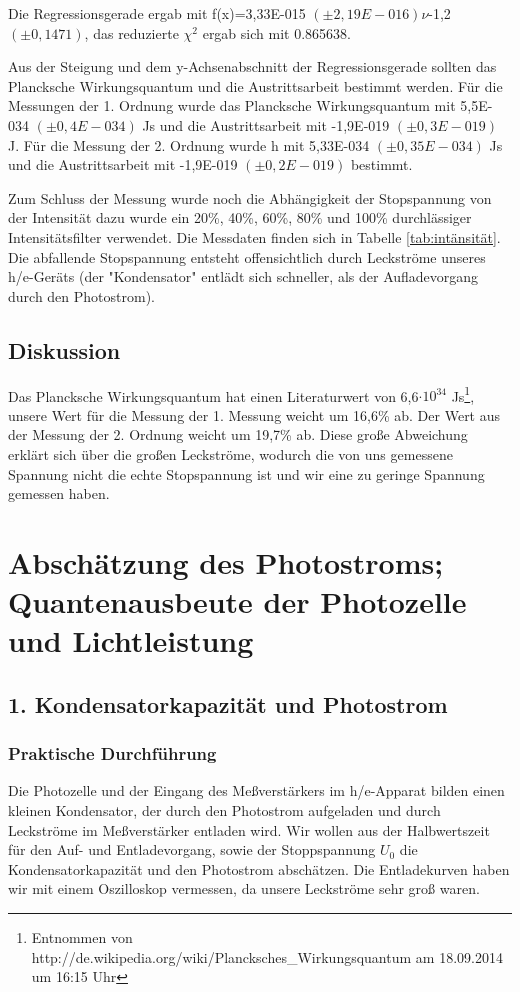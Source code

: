 \documentclass[12px]{scrartcl}
\begin{document}
Die Regressionsgerade ergab mit f(x)=3,33E-015 $(\pm 2,19E-016) \nu$-1,2 $(\pm 0,1471)$, das reduzierte $\chi^2$ ergab sich mit 0.865638.

Aus der Steigung und dem y-Achsenabschnitt der Regressionsgerade sollten das Plancksche Wirkungsquantum und die Austrittsarbeit bestimmt werden. Für die Messungen der 1. Ordnung wurde das Plancksche Wirkungsquantum mit 5,5E-034 $(\pm 0,4E-034)$ Js und die Austrittsarbeit mit -1,9E-019 $(\pm 0,3E-019)$ J. Für die Messung der 2. Ordnung wurde h mit 5,33E-034 $(\pm 0,35E-034)$ Js und die Austrittsarbeit mit -1,9E-019 $(\pm 0,2E-019)$ bestimmt.

Zum Schluss der Messung wurde noch die Abhängigkeit der Stopspannung von der Intensität dazu wurde ein 20\%, 40\%, 60\%, 80\% und 100\% durchlässiger Intensitätsfilter  verwendet. Die Messdaten finden sich in Tabelle \ref{tab:intänsität}. Die abfallende Stopspannung entsteht offensichtlich durch Leckströme unseres h/e-Geräts (der "Kondensator" entlädt sich schneller, als der Aufladevorgang durch den Photostrom).

\subsection{Diskussion}
Das Plancksche Wirkungsquantum hat einen Literaturwert von 6,6$\cdot 10^34$ Js\footnote{Entnommen von http://de.wikipedia.org/wiki/Plancksches\_Wirkungsquantum am  18.09.2014 um 16:15 Uhr}, unsere Wert für die Messung der 1. Messung weicht um 16,6\% ab. Der Wert aus der Messung der 2. Ordnung weicht um 19,7\% ab. Diese große  Abweichung erklärt sich über die großen Leckströme, wodurch die von uns gemessene Spannung nicht die echte Stopspannung ist und wir eine zu geringe Spannung gemessen haben.

\section{Abschätzung des Photostroms; Quantenausbeute der Photozelle und Lichtleistung}
\subsection{1. Kondensatorkapazität und Photostrom}
\subsubsection{Praktische Durchführung}
Die Photozelle und der Eingang des Meßverstärkers im h/e-Apparat bilden einen kleinen Kondensator, der durch den Photostrom aufgeladen und durch Leckströme im Meßverstärker entladen wird.
Wir wollen aus der Halbwertszeit für den Auf- und Entladevorgang, sowie der Stoppspannung $U_0$ die Kondensatorkapazität und den Photostrom abschätzen. Die Entladekurven haben wir mit einem Oszilloskop vermessen, da unsere Leckströme sehr groß waren.
\end{document}
